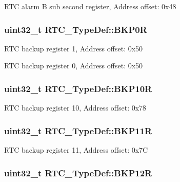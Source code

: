 R\-T\-C alarm B sub second register, Address offset\-: 0x48 \hypertarget{struct_r_t_c___type_def_ab32c76ca1f3bd0f0f46d42c2dfa74524}{
\subsubsection[{B\-K\-P0\-R}]{ uint32\-\_\-t R\-T\-C\-\_\-\-Type\-Def\-::\-B\-K\-P0\-R}}\label{struct_r_t_c___type_def_ab32c76ca1f3bd0f0f46d42c2dfa74524}
R\-T\-C backup register 1, Address offset\-: 0x50

R\-T\-C backup register 0, Address offset\-: 0x50 \hypertarget{struct_r_t_c___type_def_a5feba3d5adae3f234b3d172459163c5a}{
\subsubsection[{B\-K\-P10\-R}]{ uint32\-\_\-t R\-T\-C\-\_\-\-Type\-Def\-::\-B\-K\-P10\-R}}\label{struct_r_t_c___type_def_a5feba3d5adae3f234b3d172459163c5a}
R\-T\-C backup register 10, Address offset\-: 0x78 \hypertarget{struct_r_t_c___type_def_a8fef38e1e122778601e18f5b757c037a}{
\subsubsection[{B\-K\-P11\-R}]{ uint32\-\_\-t R\-T\-C\-\_\-\-Type\-Def\-::\-B\-K\-P11\-R}}\label{struct_r_t_c___type_def_a8fef38e1e122778601e18f5b757c037a}
R\-T\-C backup register 11, Address offset\-: 0x7\-C \hypertarget{struct_r_t_c___type_def_a6606b5d249f923aa15ab74b382cbaf7e}{
\subsubsection[{B\-K\-P12\-R}]{ uint32\-\_\-t R\-T\-C\-\_\-\-Type\-Def\-::\-B\-K\-P12\-R}}\label{struct_r_t_c___type_def_a6606b5d249f923aa15ab74b382cbaf7e}
